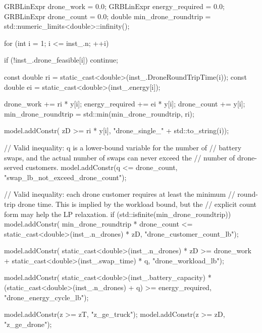 {{{            GRBLinExpr drone_work = 0.0;
            GRBLinExpr energy_required = 0.0;
            GRBLinExpr drone_count = 0.0;
            double min_drone_roundtrip = std::numeric_limits<double>::infinity();

            for (int i = 1; i <= inst_.n; ++i)
            {
                if (!inst_.drone_feasible[i])
                    continue;

                const double ri = static_cast<double>(inst_.DroneRoundTripTime(i));
                const double ei = static_cast<double>(inst_.energy[i]);

                drone_work += ri * y[i];
                energy_required += ei * y[i];
                drone_count += y[i];
                min_drone_roundtrip = std::min(min_drone_roundtrip, ri);

                model.addConstr(
                    zD >= ri * y[i],
                    "drone_single_" + std::to_string(i));
            }

            // Valid inequality: q is a lower-bound variable for the number of
            // battery swaps, and the actual number of swaps can never exceed the
            // number of drone-served customers.
            model.addConstr(q <= drone_count, "swap_lb_not_exceed_drone_count");

            // Valid inequality: each drone customer requires at least the minimum
            // round-trip drone time. This is implied by the workload bound, but the
            // explicit count form may help the LP relaxation.
            if (std::isfinite(min_drone_roundtrip))
            {
                model.addConstr(
                    min_drone_roundtrip * drone_count <=
                        static_cast<double>(inst_.n_drones) * zD,
                    "drone_customer_count_lb");
            }

            model.addConstr(
                static_cast<double>(inst_.n_drones) * zD >=
                    drone_work + static_cast<double>(inst_.swap_time) * q,
                "drone_workload_lb");

            model.addConstr(
                static_cast<double>(inst_.battery_capacity) *
                        (static_cast<double>(inst_.n_drones) + q) >=
                    energy_required,
                "drone_energy_cycle_lb");

            model.addConstr(z >= zT, "z_ge_truck");
            model.addConstr(z >= zD, "z_ge_drone");

}}}
